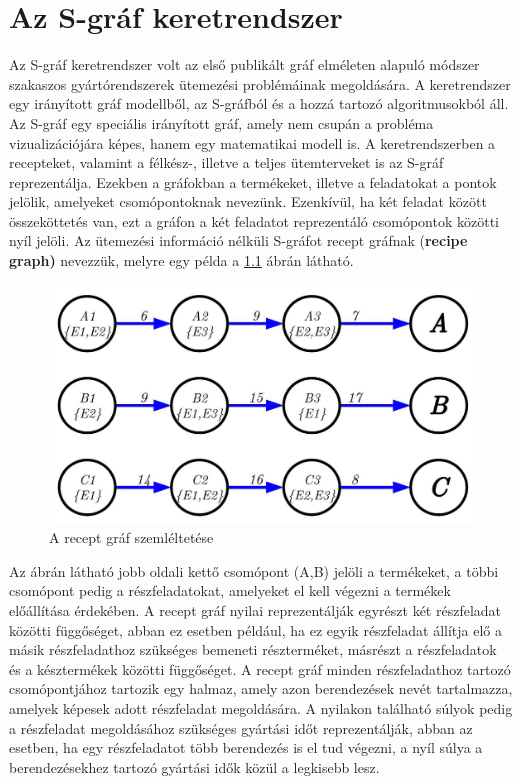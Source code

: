\chapter{Az S-gráf keretrendszer} \label{S-graph}
Az S-gráf keretrendszer volt az első publikált gráf elméleten alapuló módszer szakaszos gyártórendszerek ütemezési problémáinak megoldására. \cite{Sanmarti2002}
A keretrendszer egy irányított gráf modellből, az S-gráfból és a hozzá tartozó algoritmusokból áll. \cite{SANMARTI1998S847}
Az S-gráf egy speciális irányított gráf, amely nem csupán a probléma vizualizációjára képes, hanem egy matematikai modell is.
A keretrendszerben a recepteket, valamint a félkész-, illetve a teljes ütemterveket is az S-gráf reprezentálja.
Ezekben a gráfokban a termékeket, illetve a feladatokat a pontok jelölik, amelyeket csomópontoknak nevezünk.
Ezenkívül, ha két feladat között összeköttetés van, ezt a gráfon a két feladatot reprezentáló csomópontok közötti nyíl jelöli.
Az ütemezési információ nélküli S-gráfot recept gráfnak (\textbf{recipe graph)} nevezzük, melyre egy példa a \ref{recipeGraph} ábrán látható.
\begin{figure}[H]
\begin{center}
\includegraphics[scale=0.375]{recipeGraph}
\caption{A recept gráf szemléltetése}
\label{recipeGraph}
\end{center}
\end{figure}
Az ábrán látható jobb oldali kettő csomópont (A,B) jelöli a termékeket, a többi csomópont pedig a részfeladatokat, amelyeket el kell végezni a termékek előállítása érdekében.
A recept gráf nyilai reprezentálják egyrészt két részfeladat közötti függőséget, abban ez esetben például, ha ez egyik részfeladat állítja elő a másik részfeladathoz szükséges bemeneti részterméket, másrészt a részfeladatok és a késztermékek közötti függőséget.
A recept gráf minden részfeladathoz tartozó csomópontjához tartozik egy halmaz, amely azon berendezések nevét tartalmazza, amelyek képesek adott részfeladat megoldására.
A nyilakon található súlyok pedig a részfeladat megoldásához szükséges gyártási időt reprezentálják, abban az esetben, ha egy részfeladatot több berendezés is el tud végezni, a nyíl súlya a berendezésekhez tartozó gyártási idők közül a legkisebb lesz.

